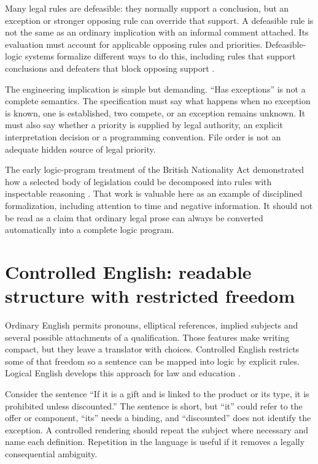 \documentclass[12pt,a4paper,oneside,openany]{book}
\begin{document}
Many legal rules are defeasible: they normally support a conclusion, but an
exception or stronger opposing rule can override that support. A defeasible
rule is not the same as an ordinary implication with an informal comment
attached. Its evaluation must account for applicable opposing rules and
priorities. Defeasible-logic systems formalize different ways to do this,
including rules that support conclusions and defeaters that block opposing
support \citep[sec.~2]{defeasible2000}.

The engineering implication is simple but demanding. ``Has exceptions'' is
not a complete semantics. The specification must say what happens when no
exception is known, one is established, two compete, or an exception remains
unknown. It must also say whether a priority is supplied by legal authority,
an explicit interpretation decision or a programming convention. File order
is not an adequate hidden source of legal priority.

The early logic-program treatment of the British Nationality Act demonstrated
how a selected body of legislation could be decomposed into rules with
inspectable reasoning \citep{sergot1986}. That work is valuable here as an
example of disciplined formalization, including attention to time and negative
information. It should not be read as a claim that ordinary legal prose can
always be converted automatically into a complete logic program.

\section{Controlled English: readable structure with restricted freedom}
\label{sec:languages-logicalenglish}
Ordinary English permits pronouns, elliptical references, implied subjects and
several possible attachments of a qualification. Those features make writing
compact, but they leave a translator with choices. Controlled English restricts
some of that freedom so a sentence can be mapped into logic by explicit rules.
Logical English develops this approach for law and education
\citep[language specification and examples]{logicalenglish2023}.

Consider the sentence ``If it is a gift and is linked to the product or its
type, it is prohibited unless discounted.'' The sentence is short, but ``it''
could refer to the offer or component, ``its'' needs a binding, and ``discounted''
does not identify the exception. A controlled rendering should repeat the
subject where necessary and name each definition. Repetition in the language
is useful if it removes a legally consequential ambiguity.
\end{document}
